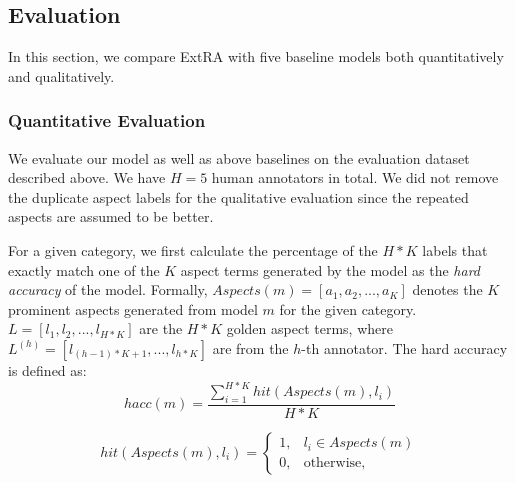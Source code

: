 
\subsection{Evaluation}
\label{sec:endeval}
In this section, we compare ExtRA with five baseline models 
both quantitatively and qualitatively.

\subsubsection{Quantitative Evaluation}
\label{sec:quaneval}


We evaluate our model as well as above baselines on the evaluation dataset described above.
We have $H=5$ human annotators in total.
We did not remove the duplicate aspect labels for the qualitative evaluation
since the repeated aspects are assumed to be better.

For a given category, we first calculate the percentage of the $H*K$ labels that exactly match one of the $K$ aspect terms generated by the model as the \textit{hard accuracy} 
of the model. 
Formally, $Aspects(m) = [a_1, a_2, ..., a_K]$ denotes 
the $K$ prominent aspects generated from model $m$ for 
the given category.
$L = [l_1, l_2, ..., l_{H*K}]$ are the $H*K$ golden aspect terms,
where $L^{(h)}= [l_{(h-1)*K+1}, ..., l_{h*K}]$ are from the $h$-th annotator.
The hard accuracy is defined as:
\begin{equation}
hacc(m) = \frac{\sum_{i=1}^{H*K}{hit(Aspects(m), l_i)}}{H*K}
\end{equation}

\begin{equation}
hit(Aspects(m), l_i) = 
\begin{cases}
1, & l_i \in Aspects(m) \\
0, & \text{otherwise, }
\end{cases}
\end{equation}

